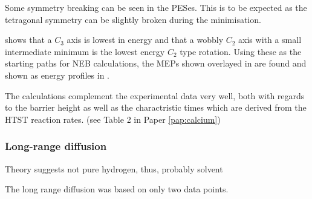 Some symmetry breaking can be seen in the PESes.
This is to be expected as the tetragonal symmetry can be slightly broken during the minimisation.

 shows that a $C_3$ axis is lowest in energy and that a wobbly $C_2$ axis with a small intermediate minimum is the lowest energy $C_2$ type rotation.
Using these as the starting paths for NEB calculations, the MEPs shown overlayed in  are found and shown as energy profiles in .

The calculations complement the experimental data very well, both with regards to the barrier height as well as the charactristic times which are derived from the HTST reaction rates. (see Table 2 in Paper \ref{pap:calcium})

\subsubsection{Long-range diffusion \pending}

\bit
\item Theory suggests not pure hydrogen, thus, probably solvent
\eit

The long range diffusion was based on only two data points.

\incomplete

